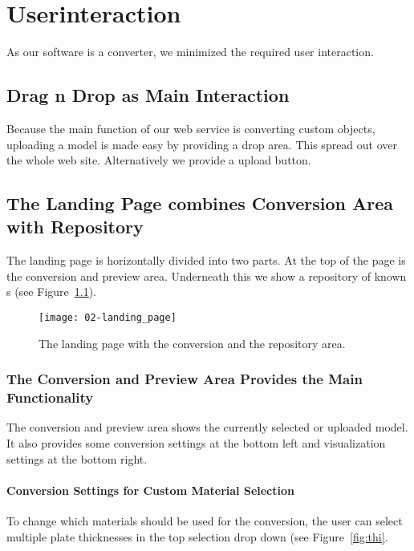 \documentclass[../ClassicThesis.tex]{subfiles}
\begin{document}
\chapter{Userinteraction}\label{ch:userinteraction}

As our software is a converter, we minimized the required user interaction.

\section{Drag n Drop as Main Interaction}

Because the main function of our web service is converting custom objects, uploading a model is made easy by providing a drop area. This spread out over the whole web site. Alternatively we provide a upload button.

\section{The Landing Page combines Conversion Area with Repository}

The landing page is horizontally divided into two parts. At the top of the page is the conversion and preview area. Underneath this we show a repository of known \threedmodel s (see Figure~\ref{fig:landing_page}).

\begin{figure}
  \centering
  \texttt{[image: 02-landing\_page]}
  \caption{The landing page with the conversion and the repository area.}
  \label{fig:landing_page}
\end{figure}

\subsection{The Conversion and Preview Area Provides the Main Functionality}

The conversion and preview area shows the currently selected or uploaded model. It also provides some conversion settings at the bottom left and visualization settings at the bottom right.

\subsubsection{Conversion Settings for Custom Material Selection}

To change which materials should be used for the conversion, the user can select multiple plate thicknesses in the top selection drop down (see Figure~\ref{fig:thi}.
\end{document}

